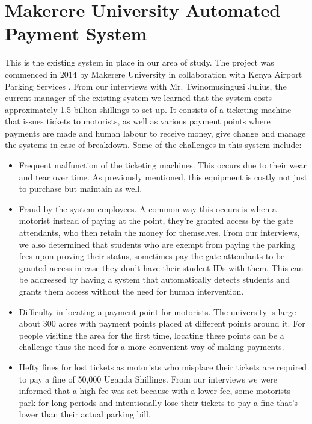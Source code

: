 \section{Makerere University Automated Payment System}
This is the existing system in place in our area of study. The project was commenced in 2014 by Makerere University in collaboration with Kenya Airport Parking Services\cite{wamai_mak_2014} .
From our interviews with Mr. Twinomusinguzi Julius, the current manager of the existing system we learned that the system costs approximately 1.5 billion shillings to set up. It consists of a ticketing machine that issues tickets to motorists, as well as various payment points where payments are made and human labour to receive money, give change and manage the systems in case of breakdown. Some of the challenges in this system include:

\begin{itemize}
    \item Frequent malfunction of the ticketing machines. This occurs due to their wear and tear over time. As previously mentioned, this equipment is costly not just to purchase but maintain as well.
    \item Fraud by the system employees. A common way this occurs is when a motorist instead of paying at the point, they're granted access by the gate attendants, who then retain the money for themselves. From our interviews, we also determined that students who are exempt from paying the parking fees upon proving their status, sometimes pay the gate attendants to be granted access in case they don't have their student IDs with them. This can be addressed by having a system that automatically detects students and grants them access without the need for human intervention.
    \item Difficulty in locating a payment point for motorists. The university is large about 300 acres with payment points placed at different points around it. For people visiting the area for the first time, locating these points can be a challenge thus the need for a more convenient way of making payments.
    \item Hefty fines for lost tickets as motorists who misplace their tickets are required to pay a fine of 50,000 Uganda Shillings. From our interviews we were informed that a high fee was set because with a lower fee, some motorists park for long periods and intentionally lose their tickets to pay a fine that's lower than their actual parking bill.
\end{itemize}


